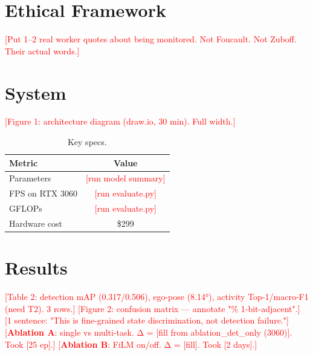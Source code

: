 \documentclass[10pt,twocolumn]{article}
\newcommand{\need}[1]{\textcolor{red}{[#1]}}
\begin{document}
\section{Ethical Framework}

\need{Put 1–2 real worker quotes about being monitored. Not Foucault. Not Zuboff. Their actual words.}

\section{System}

\need{Figure 1: architecture diagram (draw.io, 30 min). Full width.}

\begin{table}[htbp]\centering\small\caption{Key specs.}
\begin{tabular}{lc}\toprule
\textbf{Metric} & \textbf{Value}\\\midrule
Parameters & \need{run model summary}\\
FPS on RTX 3060 & \need{run evaluate.py}\\
GFLOPs & \need{run evaluate.py}\\
Hardware cost & \$299\\\bottomrule
\end{tabular}\end{table}

\section{Results}

\need{Table 2: detection mAP (0.317/0.506), ego-pose (8.14°), activity Top-1/macro-F1 (need T2). 3 rows.}
\need{Figure 2: confusion matrix — annotate "\% 1-bit-adjacent".}
\need{1 sentence: "This is fine-grained state discrimination, not detection failure."}
\need{\textbf{Ablation A}: single vs multi-task. Δ = \need{fill from ablation_det_only (3060)}. Took \need{25 ep}.}
\need{\textbf{Ablation B}: FiLM on/off. Δ = \need{fill}. Took \need{2 days}.}
\end{document}
